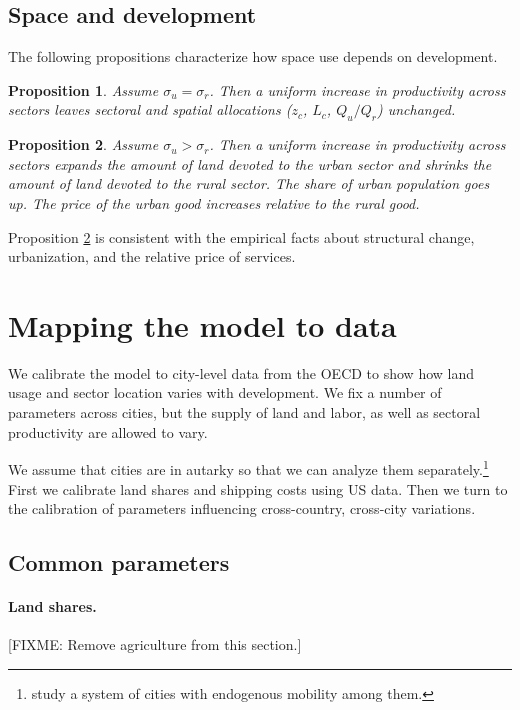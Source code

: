 \documentclass[12pt]{article}
\newtheorem{proposition}{Proposition}
\begin{document}
\subsection{Space and development}
The following propositions characterize how space use depends on development.
\begin{proposition}\label{prop:balanced_growth}
Assume $\sigma_u=\sigma_r$. Then a uniform increase in productivity across sectors leaves sectoral and spatial allocations ($z_c$, $L_c$, $Q_u/Q_r$) unchanged.
\end{proposition}

\begin{proposition}\label{prop:comparative_static}
Assume $\sigma_u>\sigma_r$. Then a uniform increase in productivity across sectors expands the amount of land devoted to the urban sector and shrinks the amount of land devoted to the rural sector. The share of urban population goes up. The price of the urban good increases relative to the rural good.
\end{proposition}

Proposition \ref{prop:comparative_static} is consistent with the empirical facts about structural change, urbanization, and the relative price of services. 


\section{Mapping the model to data}
We calibrate the model to city-level data from the OECD to show how land usage and sector location varies with development. We fix a number of parameters across cities, but the supply of land and labor, as well as sectoral productivity are allowed to vary.

We assume that cities are in autarky so that we can analyze them separately.\footnote{ study a system of cities with endogenous mobility among them.} First we calibrate land shares and shipping costs using US data. Then we turn to the calibration of parameters influencing cross-country, cross-city variations.

\subsection{Common parameters}
\paragraph{Land shares.}
[FIXME: Remove agriculture from this section.]
\end{document}

